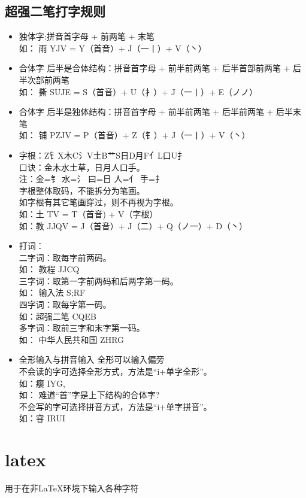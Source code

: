 \subsection{超强二笔打字规则}
\begin{itemize}
\item 独体字:拼音首字母 + 前两笔 + 末笔\\
如： 雨 YJV = Y（首音）+ J（一丨）+ V（丶）
\item 合体字 后半是合体结构：拼音首字母 + 前半前两笔 + 后半首部前两笔 + 后半次部前两笔\\
如： 撕 SUJE = S（首音）+ U（扌）+ J（一丨）+ E（ノノ）
\item 合体字 后半是独体结构：拼音首字母 + 前半前两笔 + 后半前两笔 + 后半末笔\\
如： 铺 PZJV = P（首音）+ Z（钅）+ J（一丨）+ V（丶）
\item 字根：Z钅X木C氵V土B艹S日D月F亻L口U扌\\
口诀：金木水土草，日月人口手。\\
注：金=钅 水=氵 曰=日 人=亻 手=扌\\
字根整体取码，不能拆分为笔画。\\
如字根有其它笔画穿过，则不再视为字根。\\
如：土 TV = T（首音) + V（字根）\\
如：教 JJQV = J（首音）+ J（二）+ Q（ノ一）+ D（丶）
\item 打词：\\
二字词：取每字前两码。\\
如： 教程 JJCQ\\
三字词：取第一字前两码和后两字第一码。\\
如： 输入法 S;RF\\
四字词：取每字第一码。\\
如：超强二笔 CQEB\\
多字词：取前三字和末字第一码。\\
如： 中华人民共和国 ZHRG
\item 全形输入与拼音输入
全形可以输入偏旁\\
不会读的字可选择全形方式，方法是“i+单字全形”。\\
如：瘿 IYG,\\
如： 难道“首”字是上下结构的合体字?\\
不会写的字可选择拼音方式，方法是“i+单字拼音”。\\
如：睿 IRUI
\end{itemize}

\section{latex}
 用于在非\LaTeX{}环境下输入各种字符
